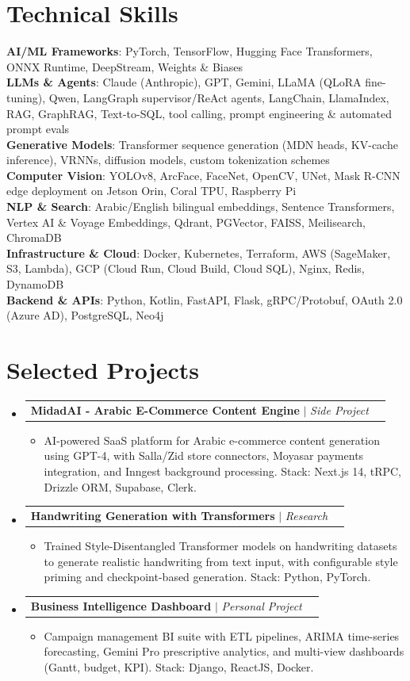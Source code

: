 \documentclass[letterpaper,11pt]{article}
\makeatletter
\newcommand{\resumeItem}[1]{
  \item\small{
    {#1 \vspace{-2pt}}
  }
}
\newcommand{\resumeProjectHeading}[2]{
    \item
    \begin{tabular*}{0.97\textwidth}{l@{\extracolsep{\fill}}r}
      \small#1 & #2 \\
    \end{tabular*}\vspace{-7pt}
}
\newcommand{\resumeSubHeadingListStart}{\begin{itemize}[leftmargin=0.15in, label={}]}
\newcommand{\resumeSubHeadingListEnd}{\end{itemize}}
\newcommand{\resumeItemListStart}{\begin{itemize}}
\newcommand{\resumeItemListEnd}{\end{itemize}\vspace{-5pt}}
\makeatother
\begin{document}
\section{Technical Skills}
 \begin{itemize}[leftmargin=0.15in, label={}]
    \small{\item{
     \textbf{AI/ML Frameworks}{: PyTorch, TensorFlow, Hugging Face Transformers, ONNX Runtime, DeepStream, Weights \& Biases} \\
     \textbf{LLMs \& Agents}{: Claude (Anthropic), GPT, Gemini, LLaMA (QLoRA fine-tuning), Qwen, LangGraph supervisor/ReAct agents, LangChain, LlamaIndex, RAG, GraphRAG, Text-to-SQL, tool calling, prompt engineering \& automated prompt evals} \\
     \textbf{Generative Models}{: Transformer sequence generation (MDN heads, KV-cache inference), VRNNs, diffusion models, custom tokenization schemes} \\
     \textbf{Computer Vision}{: YOLOv8, ArcFace, FaceNet, OpenCV, UNet, Mask R-CNN edge deployment on Jetson Orin, Coral TPU, Raspberry Pi} \\
     \textbf{NLP \& Search}{: Arabic/English bilingual embeddings, Sentence Transformers, Vertex AI \& Voyage Embeddings, Qdrant, PGVector, FAISS, Meilisearch, ChromaDB} \\
     \textbf{Infrastructure \& Cloud}{: Docker, Kubernetes, Terraform, AWS (SageMaker, S3, Lambda), GCP (Cloud Run, Cloud Build, Cloud SQL), Nginx, Redis, DynamoDB} \\
     \textbf{Backend \& APIs}{: Python, Kotlin, FastAPI, Flask, gRPC/Protobuf, OAuth 2.0 (Azure AD), PostgreSQL, Neo4j}
    }}
 \end{itemize}

\section{Selected Projects}
    \resumeSubHeadingListStart
      \resumeProjectHeading
          {\textbf{MidadAI - Arabic E-Commerce Content Engine} $|$ \emph{Side Project}}{}
          \resumeItemListStart
            \resumeItem{AI-powered SaaS platform for Arabic e-commerce content generation using GPT-4, with Salla/Zid store connectors, Moyasar payments integration, and Inngest background processing. Stack: Next.js 14, tRPC, Drizzle ORM, Supabase, Clerk.}
          \resumeItemListEnd
      \resumeProjectHeading
          {\textbf{Handwriting Generation with Transformers} $|$ \emph{Research}}{}
          \resumeItemListStart
            \resumeItem{Trained Style-Disentangled Transformer models on handwriting datasets to generate realistic handwriting from text input, with configurable style priming and checkpoint-based generation. Stack: Python, PyTorch.}
          \resumeItemListEnd
      \resumeProjectHeading
          {\textbf{Business Intelligence Dashboard} $|$ \emph{Personal Project}}{}
          \resumeItemListStart
            \resumeItem{Campaign management BI suite with ETL pipelines, ARIMA time-series forecasting, Gemini Pro prescriptive analytics, and multi-view dashboards (Gantt, budget, KPI). Stack: Django, ReactJS, Docker.}
          \resumeItemListEnd
    \resumeSubHeadingListEnd
\end{document}

